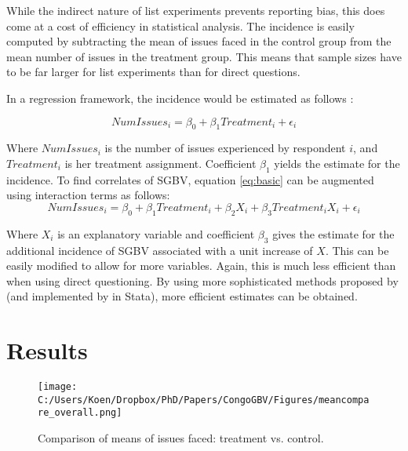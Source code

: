 While the indirect nature of list experiments prevents reporting bias, this does come at a cost of efficiency in statistical analysis. The incidence is easily computed by subtracting the mean of issues faced in the control group from the mean number of issues in the treatment group. This means that sample sizes have to be far larger for list experiments than for direct questions. 

In a regression framework, the incidence would be estimated as follows \citep{Holbrook2010}:

\begin{equation}
\label{eq:basic}
NumIssues_i = \beta_0 + \beta_1 Treatment_i + \epsilon_i
\end{equation}

Where \(NumIssues_i\) is the number of issues experienced by respondent $i$, and \(Treatment_i\) is her treatment assignment. Coefficient \(\beta_1\) yields the estimate for the incidence. To find correlates of SGBV, equation \ref{eq:basic} can be augmented using interaction terms as follows: 
\begin{equation}
\label{eq:interaction}
NumIssues_i = \beta_0 + \beta_1 Treatment_i + \beta_2 X_i + \beta_3 Treatment_i X_i + \epsilon_i
\end{equation}

Where \(X_i\) is an explanatory variable and coefficient \(\beta_3\) gives the estimate for the additional incidence of SGBV associated with a unit increase of \(X\). This can be easily modified to allow for more variables. Again, this is much less efficient than when using direct questioning. By using more sophisticated methods proposed by \citet{Imai2011} (and implemented by \cite{Tsai2019} in Stata), more efficient estimates can be obtained. 




\section{Results}

\begin{figure}[htb]
  \texttt{[image: C:/Users/Koen/Dropbox/PhD/Papers/CongoGBV/Figures/meancompare\_overall.png]}
  \caption{Comparison of means of issues faced: treatment vs. control.}
  \label{fig:meancompare_overall}
\end{figure}

